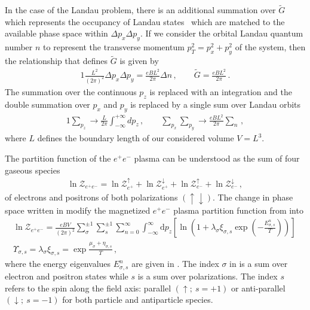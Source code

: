 In the case of the Landau problem, there is an additional summation over $\widetilde{G}$ which represents the occupancy of Landau states~\citep{greiner2012thermodynamics} which are matched to the available phase space within $\Delta p_{x}\Delta p_{y}$. If we consider the orbital Landau quantum number $n$ to represent the transverse momentum $p_{T}^{2}=p_{x}^{2}+p_{y}^{2}$ of the system, then the relationship that defines $\widetilde{G}$ is given by
\begin{alignat}{1}
    \label{phase:1} \frac{L^{2}}{(2\pi)^{2}}\Delta p_{x}\Delta p_{y}=\frac{eBL^{2}}{2\pi}\Delta n\,,\qquad\widetilde{G}=\frac{eBL^{2}}{2\pi}\,.
\end{alignat}
The summation over the continuous $p_{z}$ is replaced with an integration and the double summation over $p_{x}$ and $p_{y}$ is replaced by a single sum over Landau orbits
\begin{alignat}{1}
    \label{phase:2}
    \sum_{p_{z}}\rightarrow\frac{L}{2\pi}\int^{+\infty}_{-\infty}dp_{z}\,,\qquad\sum_{p_{x}}\sum_{p_{y}}\rightarrow\frac{eBL^{2}}{2\pi}\sum_{n}\,,
\end{alignat}
where $L$ defines the boundary length of our considered volume $V=L^{3}$.

The partition function of the $e^{+}e^{-}$ plasma can be understood as the sum of four gaseous species
\begin{align}
    \label{partition:0}    
    \ln\mathcal{Z}_{e^{+}e^{-}}=\ln\mathcal{Z}_{e^{+}}^{\uparrow}+\ln\mathcal{Z}_{e^{+}}^{\downarrow}+\ln\mathcal{Z}_{e^{-}}^{\uparrow}+\ln\mathcal{Z}_{e^{-}}^{\downarrow}\,,
\end{align}
of electrons and positrons of both polarizations $(\uparrow\downarrow)$. The change in phase space written in  modify the magnetized $e^{+}e^{-}$ plasma partition function from  into
\begin{gather}
     \label{partition:1}
     \ln\mathcal{Z}_{e^{+}e^{-}}=\frac{e{B}V}{(2\pi)^{2}}\sum_{\sigma}^{\pm1}\sum_{s}^{\pm1}\sum_{n=0}^{\infty}\int_{-\infty}^{\infty}\mathrm{d}p_{z}\left[\ln\left(1+\lambda_{\sigma}\xi_{\sigma,s}\exp\left(-\frac{E_{\sigma,s}^{n}}{T}\right)\right)\right]\,\\
    \label{partition:2}    
    \Upsilon_{\sigma,s} =\lambda_{\sigma}\xi_{\sigma,s} = \exp{\frac{\mu_{\sigma}+\eta_{\sigma,s}}{T}}\,,
\end{gather}
where the energy eigenvalues $E_{\sigma,s}^{n}$ are given in . The index $\sigma$ in  is a sum over electron and positron states while $s$ is a sum over polarizations. The index $s$ refers to the spin along the field axis: parallel $(\uparrow;\ s=+1)$ or anti-parallel $(\downarrow;\ s=-1)$ for both particle and antiparticle species.

